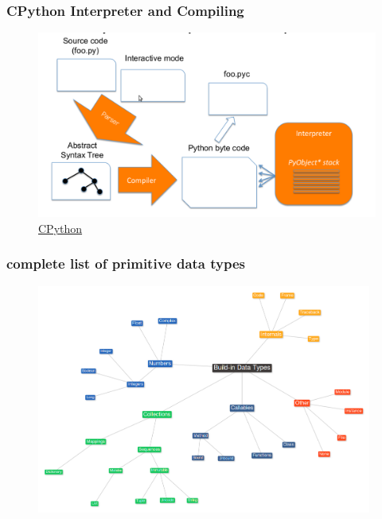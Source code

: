 \documentclass{beamer}
\begin{document}
\begin{frame}
\frametitle{CPython Interpreter and Compiling}
	\begin{figure}
	\includegraphics[width=12cm]{Cpython.png}
	\caption{\href{http://www.troeger.eu/files/teaching/pythonvm08.pdf}{CPython}}
	\end{figure}

\end{frame}
\begin{frame}
\frametitle{complete list of primitive data types}
\begin{figure}
\includegraphics[width = 11cm]{Datatypes.jpg}
\end{figure}
  
\end{frame}
\end{document}
